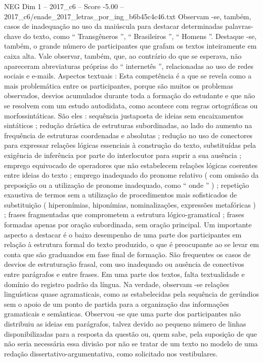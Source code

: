 \begin{textsample}{NEG Dim 1 – 2017\_c6 – Score -5.00 – 2017\_c6/enade\_2017\_letras\_por\_ing\_b6b45c4c46.txt}
Observam -se, também, casos de inadequação no uso da maiúscula para destacar determinadas palavras-chave do texto, como “ Transgêneros ”, “ Brasileiros ”, “ Homens ”.
Destaque -se, também, o grande número de participantes que grafam os textos inteiramente em caixa alta.
Vale observar, também, que, ao contrário do que se esperava, não apareceram abreviaturas próprias do “ internetês ”, relacionadas ao uso de redes sociais e e-mails.
Aspectos textuais : Esta competência é a que se revela como a mais problemática entre os participantes, porque são muitos os problemas observados, desvios acumulados durante toda a formação do estudante e que não se resolvem com um estudo autodidata, como acontece com regras ortográficas ou morfossintáticas.
São eles : sequência justaposta de ideias sem encaixamentos sintáticos ; redução drástica de estruturas subordinadas, ao lado do aumento na frequência de estruturas coordenadas e absolutas ; redução no uso de conectores para expressar relações lógicas essenciais à construção do texto, substituídas pela exigência de inferência por parte do interlocutor para suprir a sua ausência ; emprego equivocado de operadores que não estabelecem relações lógicas coerentes entre ideias do texto ; emprego inadequado do pronome relativo ( com omissão da preposição ou a utilização de pronome inadequado, como “ onde ” ) ; repetição exaustiva de termos sem a utilização de procedimentos mais sofisticados de substituição ( hiperonímias, hiponímias, nominalizações, expressões metafóricas ) ; frases fragmentadas que comprometem a estrutura lógico-gramatical ; frases formadas apenas por oração subordinada, sem oração principal.
Um importante aspecto a destacar é o baixo desempenho de uma parte dos participantes em relação à estrutura formal do texto produzido, o que é preocupante ao se levar em conta que são graduandos em fase final de formação.
São frequentes os casos de desvios de estruturação frasal, com uso inadequado ou ausência de conectivos entre parágrafos e entre frases.
Em uma parte dos textos, falta textualidade e domínio do registro padrão da língua.
Na verdade, observam -se relações linguísticas quase agramaticais, como as estabelecidas pela sequência de gerúndios sem o apoio de um ponto de partida para a organização das informações gramaticais e semânticas.
Observou -se que uma parte dos participantes não distribuiu as ideias em parágrafos, talvez devido ao pequeno número de linhas disponibilizadas para a resposta da questão ou, quem sabe, pela suposição de que não seria necessária essa divisão por não se tratar de um texto no modelo de uma redação dissertativo-argumentativa, como solicitado nos vestibulares.

\end{textsample}
